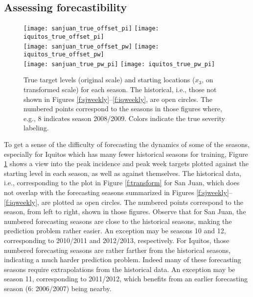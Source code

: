 \documentclass[12pt]{article}
\begin{document}
\subsection{Assessing forecastibility}
\label{sec:true}

\begin{figure}[ht!]
\centering
\texttt{[image: sanjuan\_true\_offset\_pi]} \hspace{0.5cm}
\texttt{[image: iquitos\_true\_offset\_pi]}
\\
\texttt{[image: sanjuan\_true\_offset\_pw]} \hspace{0.5cm}
\texttt{[image: iquitos\_true\_offset\_pw]} 
\\
\texttt{[image: sanjuan\_true\_pw\_pi]} \hspace{0.5cm}
\texttt{[image: iquitos\_true\_pw\_pi]}
\vspace{-0.25cm}
\caption{True target levels (original scale) and starting locations ($x_3$,
on transformed scale) for each season.  The historical, i.e., those not shown
in Figures \ref{f:sjweekly}--\ref{f:iqweekly}, are open circles.  The numbered
points correspond to the seasons in those figures where, e.g., 8 indicates
season 2008/2009.  Colors indicate the true severity labeling.}
\label{f:truetarget}
\end{figure}

To get a sense of the difficulty of forecasting the dynamics of some of the
seasons, especially for Iquitos which has many fewer historical seasons for
training, Figure \ref{f:truetarget} shows a view into the peak incidence and
peak week targets plotted against the starting level in each season, as well
as against themselves. The historical data, i.e., corresponding to the plot in
Figure \ref{f:transform} for San Juan, which does not overlap with the
forecasting seasons summarized in Figures \ref{f:sjweekly}--\ref{f:iqweekly},
are plotted as open circles.  The numbered points correspond to the season,
from left to right, shown in those figures.  Observe that for San Juan, the
numbered forecasting seasons are close to the historical seasons, making the
prediction problem rather easier.  An exception may be seasons 10 and 12,
corresponding to 2010/2011 and 2012/2013, respectively.  For Iquitos, those
numbered forecasting seasons are rather farther from the historical seasons,
indicating a much harder prediction problem.  Indeed many of these forecasting
seasons require extrapolations from the historical data.  An exception may be
season 11, corresponding to 2011/2012, which benefits from an earlier
forecasting season (6: 2006/2007) being nearby.
\end{document}
